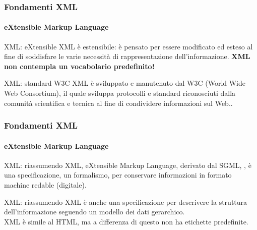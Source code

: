 \begin{frame}
	\frametitle{Fondamenti XML}
	\framesubtitle{eXtensible Markup Language}
	\addtocounter{nframe}{1}

	\begin{block}{XML: eXtensible}
		XML è estensibile: è pensato per essere modificato ed esteso al fine di soddisfare le varie necessità di rappresentazione dell'informazione.
		\textbf{XML non contempla un vocabolario predefinito!}
	\end{block}

	\begin{block} {XML: standard W3C}
		XML è sviluppato e manutenuto dal W3C (World Wide Web Consortium), il quale sviluppa protocolli e standard riconosciuti dalla comunità scientifica e tecnica al fine di condividere informazioni sul Web..
	\end{block}
\end{frame}

\begin{frame}
	\frametitle{Fondamenti XML}
	\framesubtitle{eXtensible Markup Language}
	\addtocounter{nframe}{1}

	\begin{block}{XML: riassumendo}
		XML, eXtensible Markup Language, derivato dal SGML, , 
		è una specificazione, un formalismo, per conservare informazioni in formato machine redable (digitale).
	\end{block}

	\begin{block}{XML: riassumendo}
		XML è anche una specificazione per descrivere la struttura dell'informazione seguendo un modello dei dati gerarchico.
		\\ XML è simile al HTML, ma a differenza di questo non ha etichette predefinite.
	\end{block}

\end{frame}


